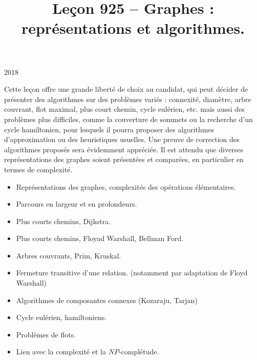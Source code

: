 \documentclass{agregfiche}
\title{Leçon 925 -- Graphes : représentations et algorithmes.}
\begin{document}
\maketitle

\secrapports

\begin{rapport}{2018}

Cette leçon offre une grande liberté de choix au candidat, qui peut décider de présenter des algorithmes sur des problèmes variés : connexité, diamètre, arbre couvrant, flot maximal, plus court chemin, cycle eulérien, etc. mais aussi des problèmes plus difficiles, comme la couverture de sommets ou la recherche d’un cycle hamiltonien, pour lesquels il pourra proposer des algorithmes d’approximation ou des heuristiques usuelles. Une preuve de correction des algorithmes proposés sera évidemment appréciée. Il est attendu que diverses représentations des graphes soient présentées et comparées, en particulier en termes de complexité.

\end{rapport}

\secindispensables

\begin{itemize}
    \item Représentations des graphes, complexités des opérations élémentaires.
	\item Parcours en largeur et en profondeurs.
    \item Plus courts chemins, Dijkstra.
\end{itemize}

\secasavoir
\begin{itemize}
    \item Plus courts chemins, Floyad Warshall, Bellman Ford.
   	\item Arbres couvrants, Prim, Kruskal.
    \item Fermeture transitive d'une relation. (notamment par adaptation de Floyd Warshall)
    \end{itemize}
\secidees

\begin{itemize}
	\item Algorithmes de composantes connexes (Kozaraju, Tarjan)
    \item Cycle eulérien, hamiltoniens. 
	\item Problèmes de flots.
    \item Lien avec la complexité et la $NP$-complétude.
\end{itemize}
\end{document}
